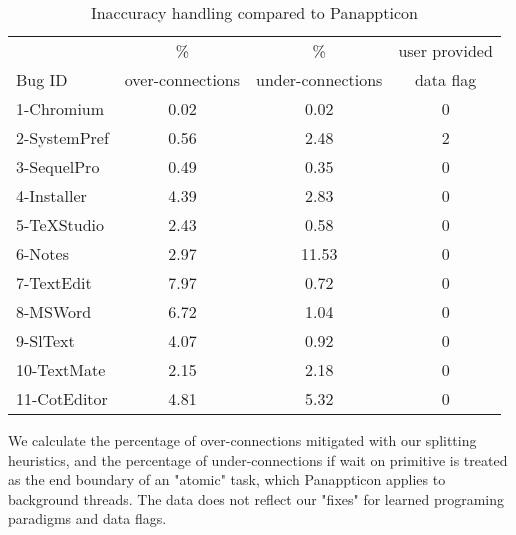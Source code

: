 
\begin{table}[ht]
\footnotesize
\centering
  \begin{tabularx}{\columnwidth}{l|ccc}
       & \% & \% & user provided \\
Bug ID & over-connections& under-connections & data flag \\
\hline
\hline
1-Chromium & 0.02 & 0.02 & 0 \\
2-SystemPref & 0.56 & 2.48 & 2 \\
3-SequelPro & 0.49 & 0.35 & 0 \\
4-Installer & 4.39 & 2.83 & 0 \\
5-TeXStudio & 2.43 & 0.58 & 0 \\
6-Notes & 2.97 & 11.53 & 0 \\
7-TextEdit & 7.97 & 0.72 & 0 \\
8-MSWord & 6.72 & 1.04 & 0 \\
9-SlText & 4.07 & 0.92 & 0 \\
10-TextMate & 2.15 & 2.18 & 0 \\
11-CotEditor & 4.81 & 5.32 & 0 \\
\hline
  \end{tabularx}

  \parbox{\columnwidth}
  {\caption{Inaccuracy handling compared to Panappticon} 
  	{

        We calculate the percentage of over-connections mitigated with our splitting
        heuristics, and the percentage of under-connections if wait on primitive is
        treated as the end boundary of an "atomic" task, which Panappticon applies to
        background threads. The data does not reflect our "fixes" for learned
        programing paradigms and data flags.
    }
  \label{table:statistics}
  }
\end{table}


